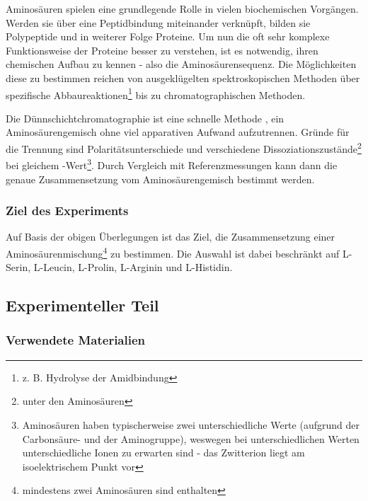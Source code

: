 \documentclass{article}
\begin{document}
        Aminosäuren spielen eine grundlegende Rolle in vielen biochemischen Vorgängen. Werden sie über eine Peptidbindung miteinander verknüpft, bilden sie Polypeptide und in weiterer Folge Proteine. Um nun die oft sehr komplexe Funktionsweise der Proteine besser zu verstehen, ist es notwendig, ihren chemischen Aufbau zu kennen - also die Aminosäurensequenz. Die Möglichkeiten diese zu bestimmen reichen von ausgeklügelten spektroskopischen Methoden über spezifische Abbaureaktionen\footnote{z. B. Hydrolyse der Amidbindung} bis zu chromatographischen Methoden. 
        
        Die Dünnschichtchromatographie ist eine schnelle Methode \cite[S. 148]{TaschenatlasAnallytik}, ein Aminosäurengemisch ohne viel apparativen Aufwand aufzutrennen. Gründe für die Trennung sind Polaritätsunterschiede und verschiedene Dissoziationszustände\footnote{unter den Aminosäuren} bei gleichem \pH-Wert\footnote{Aminosäuren haben typischerweise zwei unterschiedliche \pKa Werte (aufgrund der Carbonsäure- und der Aminogruppe), weswegen bei unterschiedlichen \pH Werten unterschiedliche Ionen zu erwarten sind - das Zwitterion liegt am isoelektrischem Punkt vor}. Durch Vergleich mit Referenzmessungen kann dann die genaue Zusammensetzung vom Aminosäurengemisch bestimmt werden.

      \subsubsection{Ziel des Experiments}
        
        Auf Basis der obigen Überlegungen ist das Ziel, die Zusammensetzung einer Aminosäurenmischung\footnote{mindestens zwei Aminosäuren sind enthalten} zu bestimmen. Die Auswahl ist dabei beschränkt auf L-Serin, L-Leucin, L-Prolin, L-Arginin und L-Histidin.
    
    \subsection{Experimenteller Teil}
  
      \subsubsection{Verwendete Materialien}
              
\end{document}
